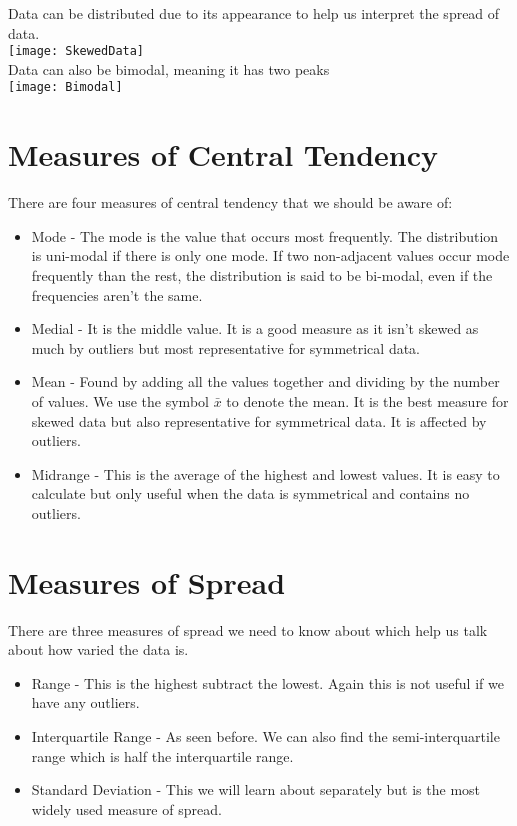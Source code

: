 \documentclass[class=article, crop=false]{standalone}
\begin{document}
Data can be distributed due to its appearance to help us interpret the spread of data. \\
\texttt{[image: SkewedData]} \\
Data can also be bimodal, meaning it has two peaks \\
\texttt{[image: Bimodal]} \\

\section*{Measures of Central Tendency}
There are four measures of central tendency that we should be aware of:
\begin{itemize}
	\item Mode - The mode is the value that occurs most frequently. The distribution is uni-modal if there is only one mode. If two non-adjacent values occur mode frequently than the rest, the distribution is said to be bi-modal, even if the frequencies aren't the same. 
	\item Medial - It is the middle value. It is a good measure as it isn't skewed as much by outliers but most representative for symmetrical data. 
	\item Mean - Found by adding all the values together and dividing by the number of values. We use the symbol $\bar{x}$ to denote the mean. It is the best measure for skewed data but also representative for symmetrical data. It is affected by outliers. 
	\item Midrange - This is the average of the highest and lowest values. It is easy to calculate but only useful when the data is symmetrical and contains no outliers. 
\end{itemize}

\section*{Measures of Spread}
There are three measures of spread we need to know about which help us talk about how varied the data is.
\begin{itemize}
	\item Range - This is the highest subtract the lowest. Again this is not useful if we have any outliers.
	\item Interquartile Range - As seen before. We can also find the semi-interquartile range which is half the interquartile range.
	\item Standard Deviation - This we will learn about separately but is the most widely used measure of spread.   
\end{itemize}
\end{document}
